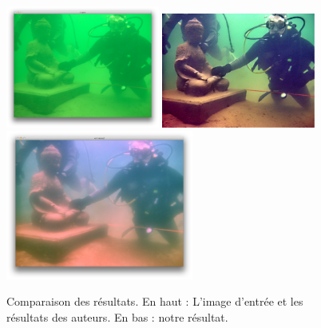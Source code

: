 \documentclass[twoside]{article}
\begin{document}
\begin{figure}[H]
  \centering
  \includegraphics[width=0.45\textwidth]{Support/input.png}
  \includegraphics[width=0.45\textwidth]{Support/theirs.png}
  \includegraphics[width=0.55\textwidth]{Support/ours.png}
  \caption{Comparaison des résultats. En haut : L'image d'entrée et les résultats des auteurs. En bas : notre résultat.}
\end{figure}
\end{document}
